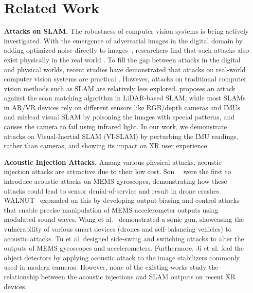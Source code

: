 \section{Related Work}
\label{sec:related}

\textbf{Attacks on SLAM.} 
The robustness of computer vision systems is being actively investigated. With the emergence of adversarial images in the digital domain by adding optimized noise directly to images~\cite{szegedy2013intriguing,carlini2017towards}, researchers find that such attacks also exist physically in the real world \cite{eykholt2018robust,song2018physical,zhao2019seeing}. To fill the gap between attacks in the digital and physical worlds, recent studies have demonstrated that attacks on real-world computer vision systems are practical \cite{eykholt2018robust,li2019adversarial,man2020ghostimage,sharif2016accessorize,zhao2019seeing,zhou2018invisible}. However, attacks on traditional computer vision methods such as SLAM are relatively less explored. \cite{yoshida2022adversarial} proposes an attack against the scan matching algorithm in LiDAR-based SLAM, while most SLAMs in AR/VR devices rely on different sensors like RGB/depth cameras and IMUs. \cite{ikram2022perceptual} and \cite{chen2024adversary} mislead visual SLAM by poisoning the images with special patterns, and \cite{wang2021can} causes the camera to fail using infrared light. In our work, we demonstrate attacks on Visual-Inertial SLAM (VI-SLAM) by perturbing the IMU readings, rather than cameras, and showing its impact on XR user experience. 

\textbf{Acoustic Injection Attacks.} Among various physical attacks, acoustic injection attacks are attractive due to their low cost. Son~\etal~\cite{son2015rocking} were the first to introduce acoustic attacks on MEMS gyroscopes, demonstrating how these attacks could lead to sensor denial-of-service and result in drone crashes. WALNUT~\cite{trippel2017walnut} expanded on this by developing output biasing and control attacks that enable precise manipulation of MEMS accelerometer outputs using modulated sound waves. Wang et al.~\cite{wang2017sonic} demonstrated a sonic gun, showcasing the vulnerability of various smart devices (\eg drones and self-balancing vehicles) to acoustic attacks. Tu et al. \cite{tu2018injected} designed side-swing and switching attacks to alter the outputs of MEMS gyroscopes and accelerometers. Furthermore, Ji et al. \cite{ji2021poltergeist} fool the object detectors by applying acoustic attack to the image stabilizers commonly used in modern cameras. However, none of the existing works study the relationship between the acoustic injections and SLAM outputs on recent XR devices. 

